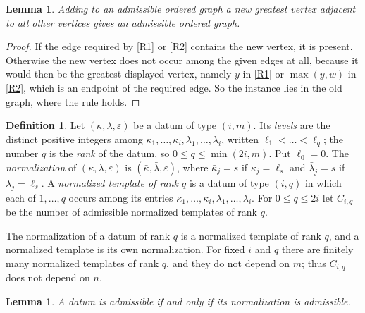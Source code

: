 \documentclass[11pt]{amsart}
\newtheorem{lemma}[theorem]{Lemma}
\theoremstyle{definition}
\newtheorem{definition}[theorem]{Definition}
\theoremstyle{remark}
\numberwithin{equation}{section}
\newcommand{\bk}{\bar\kappa}
\newcommand{\bl}{\bar\lambda}
\begin{document}
\begin{lemma}\label{lem:universal}
Adding to an admissible ordered graph a new greatest vertex adjacent to all other vertices gives an admissible ordered graph.
\end{lemma}

\begin{proof}
If the edge required by \ref{R1} or \ref{R2} contains the new vertex, it is present. Otherwise the new vertex does not occur among the given edges at all, because it would then be the greatest displayed vertex, namely $y$ in \ref{R1} or $\max(y,w)$ in \ref{R2}, which is an endpoint of the required edge. So the instance lies in the old graph, where the rule holds.
\end{proof}

\begin{definition}\label{def:template}
Let $(\kappa,\lambda,\varepsilon)$ be a datum of type $(i,m)$. Its \emph{levels} are the distinct positive integers among $\kappa_1,\dots,\kappa_i,\lambda_1,\dots,\lambda_i$, written $\ell_1<\dots<\ell_q$; the number $q$ is the \emph{rank} of the datum, so $0\le q\le\min(2i,m)$. Put $\ell_0=0$. The \emph{normalization} of $(\kappa,\lambda,\varepsilon)$ is $(\bk,\bl,\varepsilon)$, where $\bk_j=s$ if $\kappa_j=\ell_s$ and $\bl_j=s$ if $\lambda_j=\ell_s$. A \emph{normalized template of rank $q$} is a datum of type $(i,q)$ in which each of $1,\dots,q$ occurs among its entries $\kappa_1,\dots,\kappa_i,\lambda_1,\dots,\lambda_i$. For $0\le q\le 2i$ let $C_{i,q}$ be the number of admissible normalized templates of rank $q$.
\end{definition}

The normalization of a datum of rank $q$ is a normalized template of rank $q$, and a normalized template is its own normalization. For fixed $i$ and $q$ there are finitely many normalized templates of rank $q$, and they do not depend on $m$; thus $C_{i,q}$ does not depend on $n$.

\begin{lemma}\label{lem:reduction}
A datum is admissible if and only if its normalization is admissible.
\end{lemma}
\end{document}
